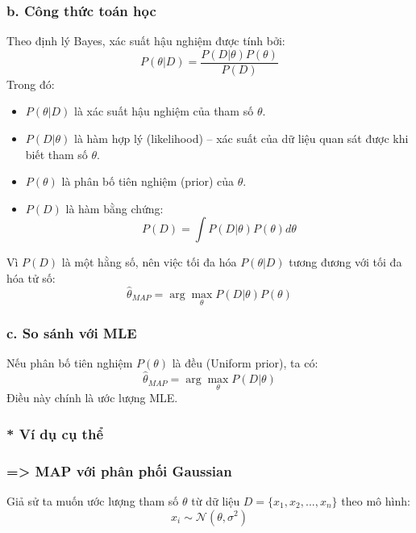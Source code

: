 \subsubsection{b. Công thức toán học}
Theo định lý Bayes, xác suất hậu nghiệm được tính bởi:
\begin{equation}
P(\theta | D) = \frac{P(D | \theta) P(\theta)}{P(D)}
\end{equation}
Trong đó:
\begin{itemize}
    \item $P(\theta | D)$ là xác suất hậu nghiệm của tham số $\theta$.
    \item $P(D | \theta)$ là hàm hợp lý (likelihood) – xác suất của dữ liệu quan sát được khi biết tham số $\theta$.
    \item $P(\theta)$ là phân bố tiên nghiệm (prior) của $\theta$.
    \item $P(D)$ là hàm bằng chứng:
    \begin{equation}
    P(D) = \int P(D | \theta) P(\theta) d\theta
    \end{equation}
\end{itemize}
Vì $P(D)$ là một hằng số, nên việc tối đa hóa $P(\theta | D)$ tương đương với tối đa hóa tử số:
\begin{equation}
\hat{\theta}_{MAP} = \arg\max_{\theta} P(D | \theta) P(\theta)
\end{equation}

\subsubsection{c. So sánh với MLE}
Nếu phân bố tiên nghiệm $P(\theta)$ là đều (Uniform prior), ta có:
\begin{equation}
\hat{\theta}_{MAP} = \arg\max_{\theta} P(D | \theta)
\end{equation}
Điều này chính là ước lượng MLE.

\subsubsection{* Ví dụ cụ thể}
\subsubsection{=> MAP với phân phối Gaussian}

Giả sử ta muốn ước lượng tham số $\theta$ từ dữ liệu $D = \{x_1, x_2, ..., x_n\}$ theo mô hình:
\begin{equation*}
    x_i \sim \mathcal{N}(\theta, \sigma^2)
\end{equation*}

